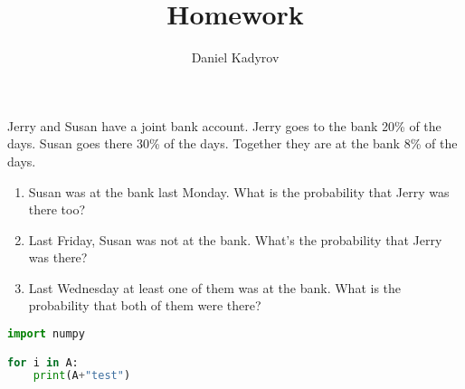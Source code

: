 \documentclass{homework}
\title{Homework}
\author{Daniel Kadyrov}
\begin{document}
\maketitle

\begin{problem}[1]
    Jerry and Susan have a joint bank account. Jerry goes to the bank 20\% of the days.
    Susan goes there 30\% of the days.
    Together they are at the bank 8\% of the days.
    \begin{enumerate}[label=\alph*.]
        \item Susan was at the bank last Monday. What is the probability that Jerry was there too?
        \item Last Friday, Susan was not at the bank. What's the probability that Jerry was there?
        \item Last Wednesday at least one of them was at the bank. What is the probability that both of them were there?
    \end{enumerate}
\end{problem}

\begin{solution}

\begin{lstlisting}[language=Python]
import numpy

for i in A:
    print(A+"test")
\end{lstlisting}

\end{solution}

\vspace{4mm}
\end{document}
